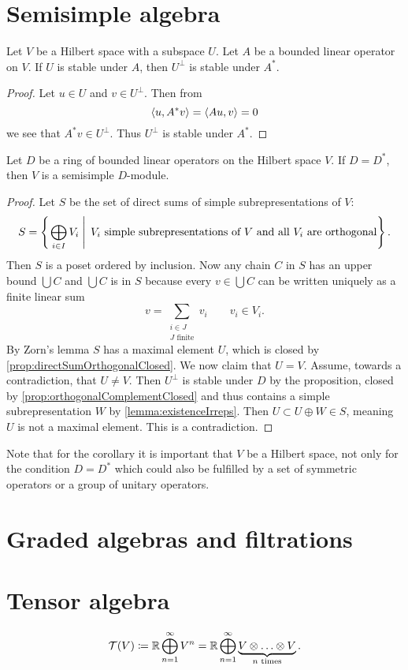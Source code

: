 \section{Semisimple algebra}
\begin{proposition}
Let $V$ be a Hilbert space with a subspace $U$. Let $A$ be a bounded linear operator on $V$. If $U$ is stable under $A$, then $U^\perp$ is stable under $A^*$.
\end{proposition}
\begin{proof}
Let $u\in U$ and $v\in U^\perp$. Then from
\[ \left\langle u, A^*v \right\rangle = \left\langle Au,v \right\rangle = 0 \]
we see that $A^*v \in U^\perp$. Thus $U^\perp$ is stable under $A^*$.
\end{proof}
\begin{corollary}
Let $D$ be a ring of bounded linear operators on the Hilbert space $V$. If $D=D^*$, then $V$ is a semisimple $D$-module.
\end{corollary}
\begin{proof}
Let $S$ be the set of direct sums of simple subrepresentations of $V$:
\[ S = \left\{\left. \bigoplus_{i\in I}V_i  \;\right|\; \text{$V_i$ simple subrepresentations of $V$ and all $V_i$ are orthogonal} \right\}. \]
Then $S$ is a poset ordered by inclusion. Now any chain $C$ in $S$ has an upper bound $\bigcup C$ and $\bigcup C$ is in $S$ because every $v\in\bigcup C$ can be written uniquely as a finite linear sum
\[ v = \sum_{\substack{i\in J\\ \text{$J$ finite}}} v_i \qquad v_i\in V_i. \]
By Zorn's lemma $S$ has a maximal element $U$, which is closed by \ref{prop:directSumOrthogonalClosed}. We now claim that $U=V$. Assume, towards a contradiction, that $U\neq V$. Then $U^\perp$ is stable under $D$ by the proposition, closed by \ref{prop:orthogonalComplementClosed} and thus contains a simple subrepresentation $W$ by \ref{lemma:existenceIrreps}. Then $U\subset U\oplus W \in S$, meaning $U$ is not a maximal element. This is a contradiction.
\end{proof}
Note that for the corollary it is important that $V$ be a Hilbert space, not only for the condition $D=D^*$ which could also be fulfilled by a set of symmetric operators or a group of unitary operators.


\section{Graded algebras and filtrations}

\section{Tensor algebra}
\[ \mathcal{T}(V) \coloneqq \mathbb{R} \bigoplus_{n=1}^\infty V^n = \mathbb{R} \bigoplus_{n=1}^\infty \underbrace{V\otimes \ldots \otimes V}_{\text{$n$ times}}. \]

